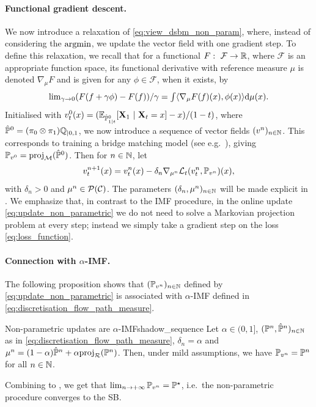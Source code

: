 \documentclass{article}
\begin{document}
\paragraph{Functional gradient descent.} We now introduce a relaxation of \eqref{eq:view_dsbm_non_param}, where, instead of considering the $\mathrm{argmin}$, we update the vector field with one gradient step. To define this relaxation, we recall that for a functional $F: \ \mathcal{F} \to \mathbb{R}$, where $\mathcal{F}$ is an appropriate function space, its functional derivative \citep{courant2008methods} with reference measure $\mu$ is denoted $\nabla_\mu F$ and is given for any $\phi \in \mathcal{F}$, when it exists, by 
\begin{equation}
\label{eq:functional_derivative}
 \textstyle \lim_{\gamma \to 0} (F(f + \gamma \phi) - F(f)) / \gamma = \int \langle \nabla_\mu F(f) (x), \phi(x) \rangle \rmd \mu(x).
\end{equation}
Initialised with $v_t^0(x) = (\mathbb{E}_{\hat{\mathbb{P}}^0_{1|t}}[\mathbf{X}_1 \ | \ \mathbf{X}_t = x] - x)/(1-t)$,
where $\hat{\mathbb{P}}^0 = (\pi_0 \otimes \pi_1) \mathbb{Q}_{|0,1}$, we now introduce a sequence of vector fields $(v^n)_{n \in \mathbb{N}}$.  This corresponds to training a bridge matching model (see e.g.~\cite{liu2023I2SB,albergo2023stochastic}), giving $\mathbb{P}_{v^0} = \mathrm{proj}_{\mathcal{M}}(\hat{\mathbb{P}}^0)$. Then for $n \in \mathbb{N}$, %
let 
\begin{equation}
\label{eq:update_non_parametric}
    v^{n+1}_t(x) = v^n_t(x) - \delta_n \nabla_{\mu^n} \Lnonparam_t(v^n_t, \Pbb_{v^n})(x) ,
\end{equation}
with $\delta_n > 0$ and $\mu^n \in \mathcal{P}(\mathcal{C})$. The parameters $(\delta_n, \mu^n)_{n \in \mathbb{N}}$ will be made explicit in .
We emphasize that, in contrast to the IMF procedure, in the online update \eqref{eq:update_non_parametric} we do not need to solve a Markovian projection problem at every step; instead we simply take a gradient step on the loss \eqref{eq:loss_function}.

\paragraph{Connection with $\alpha$-IMF. }
The following proposition shows that $(\mathbb{P}_{v^n})_{n \in \mathbb{N}}$ defined by \eqref{eq:update_non_parametric} is associated with $\alpha$-IMF defined in  \eqref{eq:discretisation_flow_path_measure}. 
\begin{proposition}{Non-parametric updates are $\alpha$-IMF}{shadow_sequence}
Let $\alpha \in (0,1]$, $(\mathbb{P}^n, \hat{\mathbb{P}}^n)_{n \in \mathbb{N}}$ as in \eqref{eq:discretisation_flow_path_measure}, $\delta_n =  \alpha$ and $\mu^n = (1-\alpha) \hat{\mathbb{P}}^n + \alpha \mathrm{proj}_{\mathcal{R}}(\mathbb{P}^n)$. Then, under mild assumptions, we have $\mathbb{P}_{v^n} = \mathbb{P}^n$ for all $n \in \mathbb{N}$.
\end{proposition}
Combining  to , we get that $\lim_{n \to +\infty} \mathbb{P}_{v^n} = \mathbb{P}^\star$, i.e.~the non-parametric procedure converges to the SB. 
\end{document}
